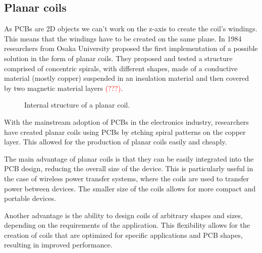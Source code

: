 \subsection{Planar coils}
As PCBs are 2D objects we can't work on the z-axis to create the coil's windings. This means that the windings have to be created on the same plane. 
In 1984 researchers from Osaka University proposed the first implementation of a possible solution in the form of planar coils.
They proposed and tested a structure comprised of concentric spirals, with different shapes, made of a conductive material (mostly copper) suspended in an insulation material and then covered by two magnetic material layers \textcolor{red}{(???)}\cite{OG_plan_coils}. %

\begin{figure}
    \centering
    \resizebox{.8\linewidth}{!}{}
    \caption{Internal structure of a planar coil.}
    \label{fig: Planar_coil_structure}
\end{figure}


With the mainstream adoption of PCBs in the electronics industry, researchers have created planar coils using PCBs by etching spiral patterns on the copper layer. This allowed for the production of planar coils easily and cheaply.

The main advantage of planar coils is that they can be easily integrated into the PCB design, reducing the overall size of the device. This is particularly useful in the case of wireless power transfer systems, where the coils are used to transfer power between devices. The smaller size of the coils allows for more compact and portable devices.

Another advantage is the ability to design coils of arbitrary shapes and sizes, depending on the requirements of the application. This flexibility allows for the creation of coils that are optimized for specific applications and PCB shapes, resulting in improved performance.

